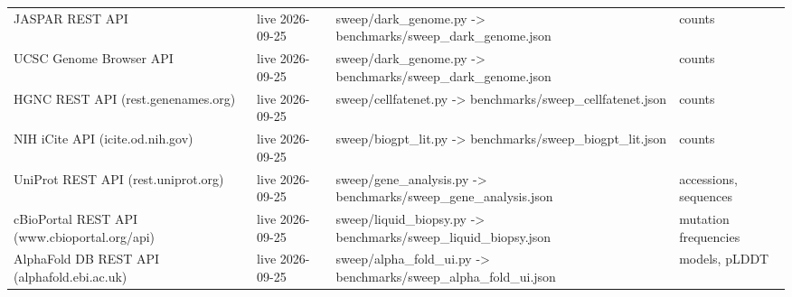 \begin{center}
\begin{tabular}{lp{1.8cm}p{7.5cm}l}
JASPAR REST API & live 2026-09-25 & sweep/dark\_genome.py -> benchmarks/sweep\_dark\_genome.json & counts\\
UCSC Genome Browser API & live 2026-09-25 & sweep/dark\_genome.py -> benchmarks/sweep\_dark\_genome.json & counts\\
HGNC REST API (rest.genenames.org) & live 2026-09-25 & sweep/cellfatenet.py -> benchmarks/sweep\_cellfatenet.json & counts\\
NIH iCite API (icite.od.nih.gov) & live 2026-09-25 & sweep/biogpt\_lit.py -> benchmarks/sweep\_biogpt\_lit.json & counts\\
UniProt REST API (rest.uniprot.org) & live 2026-09-25 & sweep/gene\_analysis.py -> benchmarks/sweep\_gene\_analysis.json & accessions, sequences\\
cBioPortal REST API (www.cbioportal.org/api) & live 2026-09-25 & sweep/liquid\_biopsy.py -> benchmarks/sweep\_liquid\_biopsy.json & mutation frequencies\\
AlphaFold DB REST API (alphafold.ebi.ac.uk) & live 2026-09-25 & sweep/alpha\_fold\_ui.py -> benchmarks/sweep\_alpha\_fold\_ui.json & models, pLDDT\\
\hline\end{tabular}\end{center}
